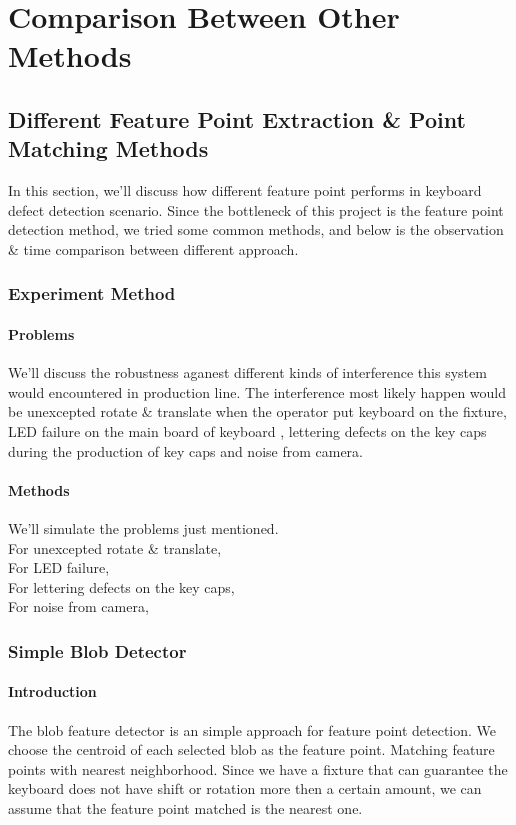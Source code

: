 \chapter{Comparison Between Other Methods}
\label{c:comparision}

\section{Different Feature Point Extraction \& Point Matching Methods}
	In this section, we'll discuss how different feature point performs in keyboard defect detection scenario.
	Since the bottleneck of this project is the feature point detection method, we tried some common methods, and below is the observation \& time comparison between different approach.
	\subsection{Experiment Method}
		\subsubsection{Problems}
			We'll discuss the robustness aganest different kinds of interference this system would encountered in production line.
			The interference most likely happen would be 
			unexcepted rotate \& translate when the operator put keyboard on the fixture, 
			LED failure on the main board of keyboard , 
			lettering defects on the key caps during the production of key caps 
			and noise from camera.
		\subsubsection{Methods}
			We'll simulate the problems just mentioned.\\
			For unexcepted rotate \& translate, \\
			For LED failure, \\
			For lettering defects on the key caps, \\
			For noise from camera, \\



	\subsection{Simple Blob Detector}
		\subsubsection{Introduction}
			The blob feature detector is an simple approach for feature point detection. We choose the centroid of each selected blob as the feature point. Matching feature points with nearest neighborhood. 
			Since we have a fixture that can guarantee the keyboard does not have shift or rotation more then a certain amount, we can assume that the feature point matched is the nearest one.
